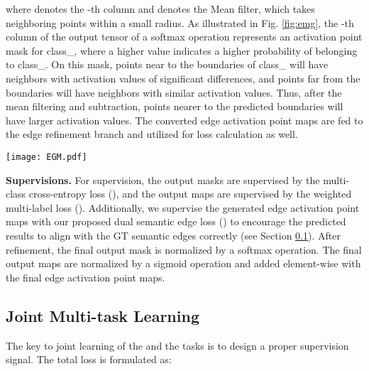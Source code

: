\documentclass[runningheads]{llncs}
\begin{document}
where { denotes the -th column and}  denotes the Mean filter, which takes neighboring points within a small radius. {As illustrated in Fig. \ref{fig:emg}, the -th column of the output tensor of {a} softmax operation represents an activation point mask for class\_{,} where a higher value indicates a higher probability of belonging to class\_. On this mask, points near to the boundaries of class\_ will have neighbors with activation values of significant differences, and points far from the boundaries will have neighbors with similar activation values. Thus, after the mean filtering and subtraction, points nearer to the predicted boundaries will have larger activation values.}
The converted edge activation point maps are fed to the edge refinement branch and utilized for loss calculation as well.

\begin{figure*}[ht]
    \centering
    \texttt{[image: EGM.pdf]}
    \caption{Illustration of the edge map generation process on 2D points. (Left) An activation point mask, {with dark colors representing} high activation values. Three red points represent three different situations: far from the activated region, near the boundary, and within the activated region. (Middle) The activation point mask after the mean filtering; (Right) The generated edge activation point map.}
    \label{fig:emg}
\end{figure*}


\smallskip \noindent \textbf{Supervisions.}
For supervision, the output {\SemSegPoint} masks are supervised by the multi-class cross-entropy loss (), and the output {\SemEdgePoint} maps are supervised by the weighted multi-label loss (). Additionally, we supervise the generated edge activation point maps with {our proposed} dual semantic edge loss () 
to encourage the predicted {\SemSeg} results to align with the GT semantic edges correctly (see Section \ref{Joint multi-task learning}). After refinement, the final output {\SemSegPoint} mask is normalized by a softmax operation. The final output {\SemEdgePoint} maps are normalized by a sigmoid operation and added element-wise with the final edge activation point maps.



 
\subsection{Joint Multi-task Learning} \label{Joint multi-task learning}

The key to joint learning of the {\SemSeg} and the {\SemEdgeD} tasks is {to design} a proper supervision signal. The total loss is formulated as:
    
\end{document}
